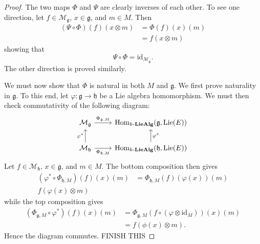 \begin{proof}
  The two maps $ \Phi $ and $ \Psi $ are clearly inverses of each other. To see one direction, let $ f \in \mathcal{M}_\mathfrak{g} $, $ x \in \mathfrak{g} $, and $ m \in M $. Then
  \begin{align*}
    (\Psi \circ \Phi)(f)(x \otimes m) &= \Phi(f)(x)(m) \\
                                      &= f(x \otimes m)
  \end{align*}
  showing that
  \begin{equation}
    \Psi \circ \Phi = \text{id}_{\mathcal{M}_{\mathfrak{g}}}.
  \end{equation}
  The other direction is proved similarly.

  We must now show that $ \Phi $ is natural in both $ M $ and $ \mathfrak{g} $. We first prove naturality in $ \mathfrak{g} $. To this end, let $ \varphi: \mathfrak{g} \to \mathfrak{h} $ be a Lie algebra homomorphism. We must then check commutativity of the following diagram:
  \[\begin{tikzcd}
	  {\mathcal{M}_\mathfrak{g}} & {\text{Hom}_{k\text{-}\mathbf{LieAlg}}(\mathfrak{g}, \text{Lie}(E))} \\
	  {\mathcal{M}_\mathfrak{h}} & {\text{Hom}_{k\text{-}\mathbf{LieAlg}}(\mathfrak{h}, \text{Lie}(E))}
	  \arrow["{\Phi_{\mathfrak{h},M}}"', from=2-1, to=2-2]
	  \arrow["{\Phi_{\mathfrak{g}, M}}", from=1-1, to=1-2]
	  \arrow["{\varphi^*}"', from=2-2, to=1-2]
	  \arrow["{\varphi^*}", from=2-1, to=1-1]
  \end{tikzcd}\]
  Let $ f \in \mathcal{M}_\mathfrak{h} $, $ x \in \mathfrak{g} $, and $ m \in M $. The bottom composition then gives
  \begin{align*}
    (\varphi^* \circ \Phi_{\mathfrak{h}, M})(f)(x)(m) &= \Phi_{\mathfrak{h}, M}(f)(\varphi(x))(m) \\
    f(\varphi(x) \otimes m)
  \end{align*}
  while the top composition gives
  \begin{align*}
    (\Phi_{\mathfrak{g}, M} \circ \varphi^*)(f)(x)(m) &= \Phi_{\mathfrak{g}, M}(f \circ (\varphi \otimes \text{id}_M))(x)(m) \\
                                                      &= f(\phi(x) \otimes m)
  .\end{align*}
  Hence the diagram commutes. FINISH THIS
\end{proof}

